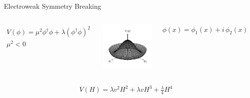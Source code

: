 \documentclass[11pt, xcolor={dvipsnames}, aspectratio=169]{beamer}
\begin{document}
\begin{frame}{Electroweak Symmetry Breaking}

  \begin{columns}
    \centering


    \begin{align*}
      V(\phi) = \mu^2 \phi^\dag \phi + \lambda (\phi^\dag \phi)^2 \\
      \mu^2 < 0
    \end{align*}

    \centering

    \includegraphics[width=\textwidth]{theory/potential}

    $\phi(x) = \phi_1(x) + i \, \phi_2(x)$
  \end{columns}

  \begin{align*}
    V(H) = \lambda v^2 H^2 + \lambda v H^3 + \frac{\lambda}{4} H^4
  \end{align*}
\end{frame}

\end{document}

